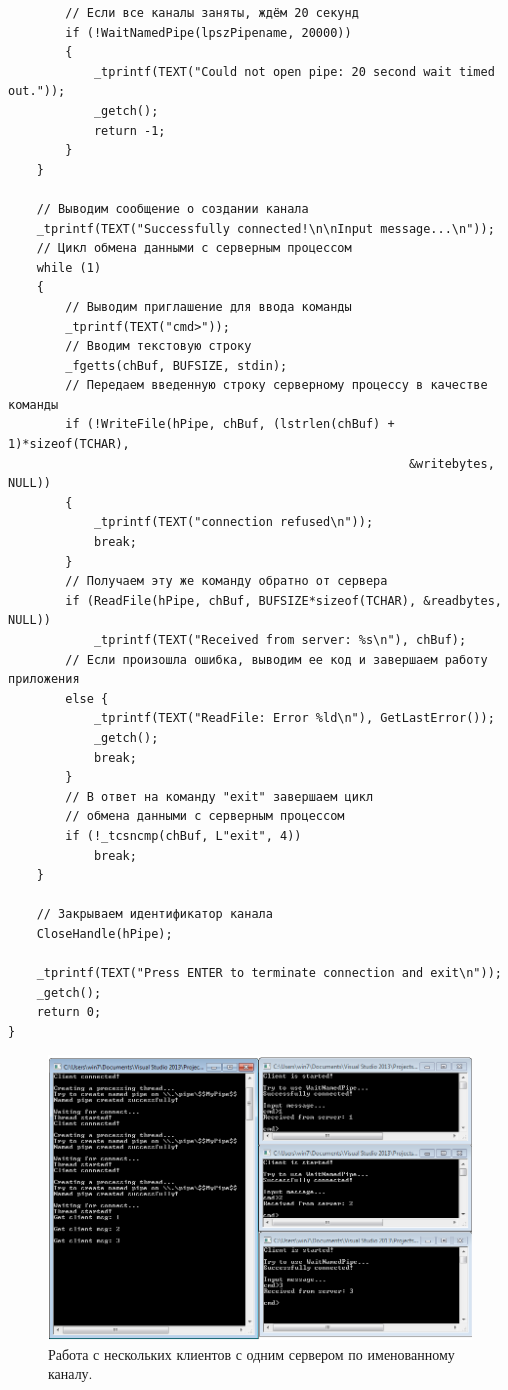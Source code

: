\documentclass[a4paper,12pt]{article} %
\begin{document}
\begin{verbatim}
        // Если все каналы заняты, ждём 20 секунд 
        if (!WaitNamedPipe(lpszPipename, 20000))
        {
            _tprintf(TEXT("Could not open pipe: 20 second wait timed out."));
            _getch();
            return -1;
        }
    }

    // Выводим сообщение о создании канала
    _tprintf(TEXT("Successfully connected!\n\nInput message...\n"));
    // Цикл обмена данными с серверным процессом
    while (1)
    {
        // Выводим приглашение для ввода команды
        _tprintf(TEXT("cmd>"));
        // Вводим текстовую строку
        _fgetts(chBuf, BUFSIZE, stdin);
        // Передаем введенную строку серверному процессу в качестве команды
        if (!WriteFile(hPipe, chBuf, (lstrlen(chBuf) + 1)*sizeof(TCHAR),
                                                        &writebytes, NULL))
        {
            _tprintf(TEXT("connection refused\n"));
            break;
        }
        // Получаем эту же команду обратно от сервера
        if (ReadFile(hPipe, chBuf, BUFSIZE*sizeof(TCHAR), &readbytes, NULL))
            _tprintf(TEXT("Received from server: %s\n"), chBuf);
        // Если произошла ошибка, выводим ее код и завершаем работу приложения
        else {
            _tprintf(TEXT("ReadFile: Error %ld\n"), GetLastError());
            _getch();
            break;
        }
        // В ответ на команду "exit" завершаем цикл
        // обмена данными с серверным процессом
        if (!_tcsncmp(chBuf, L"exit", 4))
            break;
    }

    // Закрываем идентификатор канала
    CloseHandle(hPipe);
    
    _tprintf(TEXT("Press ENTER to terminate connection and exit\n"));
    _getch();
    return 0;
}
\end{verbatim}

\begin{figure}[h!]
\centering
\includegraphics[scale=0.8]{img/03_named_pipes}
\caption{Работа с нескольких клиентов с одним сервером по именованному каналу.}
\end{figure}
\end{document}
